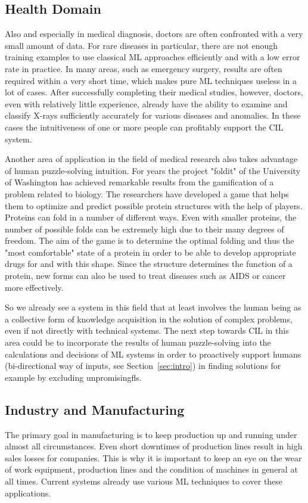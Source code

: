 \documentclass[conference]{IEEEtran}
\begin{document}
\subsection{Health Domain}
Also and especially in medical diagnosis, doctors are often confronted with a very small amount of data.
For rare diseases in particular, there are not enough training examples to use classical ML approaches efficiently and with a low error rate in practice.
In many areas, such as emergency surgery, results are often required within a very short time, which makes pure ML techniques useless in a lot of cases.
After successfully completing their medical studies, however, doctors, even with relatively little experience, already have the ability to examine and classify X-rays sufficiently accurately for various diseases and anomalies.
In these cases the intuitiveness of one or more people can profitably support the CIL system.

Another area of application in the field of medical research also takes advantage of human puzzle-solving intuition. 
For years the project "foldit" of the University of Washington has achieved remarkable results\cite{Foldit:results} from the gamification of a problem related to biology.
The researchers have developed a game that helps them to optimize and predict possible protein structures with the help of 
players\cite{Foldit:web}.
Proteins can fold in a number of different ways. Even with smaller proteins, the number of possible folds can be extremely high due to their many degrees of freedom.
The aim of the game is to determine the optimal folding and thus the "most comfortable" state of a protein in order to be able to develop appropriate drugs for and with this shape.
Since the structure determines the function of a protein\cite{Foldit:web}, new forms can also be used to treat diseases such as AIDS or cancer more effectively.

So we already see a system in this field that at least involves the human being as a collective form of knowledge acquisition in the solution of complex problems, even if not directly with technical systems.
The next step towards CIL in this area could be to incorporate the results of human puzzle-solving into the calculations and decisions of ML systems in order to proactively support humans (bi-directional way of inputs, see Section~\ref{sec:intro}) in finding solutions 
for example by excluding unpromisingfls.


\subsection{Industry and Manufacturing}
The primary goal in manufacturing is to keep production up and running under almost all circumstances. 
Even short downtimes of production lines result in high sales losses for companies.
This is why it is important to keep an eye on the wear of work equipment, production lines and the condition of machines in general at all times.
Current systems already use various ML techniques\cite{Manu:wuest} to cover these applications.
\end{document}
